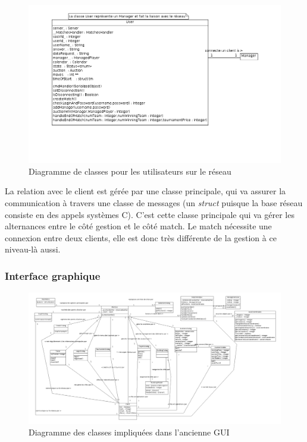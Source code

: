 \documentclass[a4paper,titlepage]{scrreprt}
\begin{document}
        
          \begin{figure}[H]
          \center
          \includegraphics[scale=0.35]{uml/class/User.png}
         \caption{Diagramme de classes pour les utilisateurs sur le réseau}
         \end{figure}

          La relation avec le client est gérée par une classe principale, qui va assurer la communication
          à travers une classe de messages (un \emph{struct} puisque la base réseau consiste en des appels systèmes C).
          C'est cette classe principale qui va gérer les alternances entre le côté gestion et le côté match. Le match nécessite une connexion entre deux clients, elle est donc très différente de la gestion
          à ce niveau-là aussi.

      \subsubsection{Interface graphique}
      \begin{landscape}
      \begin{figure}[H]
          \center
          \includegraphics[scale=0.35]{uml/class/GUIClasses.png}
         \caption{Diagramme des classes impliquées dans l'ancienne GUI}
      \end{figure}
      \end{landscape}
         
\end{document}

